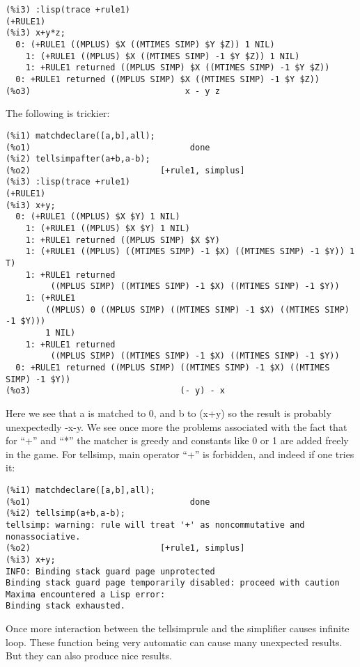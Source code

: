\documentclass[a4paper,11pt]{article}
\begin{document}
\begin{verbatim}
(%i3) :lisp(trace +rule1)
(+RULE1)
(%i3) x+y*z;
  0: (+RULE1 ((MPLUS) $X ((MTIMES SIMP) $Y $Z)) 1 NIL)
    1: (+RULE1 ((MPLUS) $X ((MTIMES SIMP) -1 $Y $Z)) 1 NIL)
    1: +RULE1 returned ((MPLUS SIMP) $X ((MTIMES SIMP) -1 $Y $Z))
  0: +RULE1 returned ((MPLUS SIMP) $X ((MTIMES SIMP) -1 $Y $Z))
(%o3)                               x - y z
\end{verbatim}
The following is trickier:
\begin{verbatim}
(%i1) matchdeclare([a,b],all);
(%o1)                                done
(%i2) tellsimpafter(a+b,a-b);
(%o2)                          [+rule1, simplus]
(%i3) :lisp(trace +rule1)
(+RULE1)
(%i3) x+y;
  0: (+RULE1 ((MPLUS) $X $Y) 1 NIL)
    1: (+RULE1 ((MPLUS) $X $Y) 1 NIL)
    1: +RULE1 returned ((MPLUS SIMP) $X $Y)
    1: (+RULE1 ((MPLUS) ((MTIMES SIMP) -1 $X) ((MTIMES SIMP) -1 $Y)) 1 T)
    1: +RULE1 returned
         ((MPLUS SIMP) ((MTIMES SIMP) -1 $X) ((MTIMES SIMP) -1 $Y))
    1: (+RULE1
        ((MPLUS) 0 ((MPLUS SIMP) ((MTIMES SIMP) -1 $X) ((MTIMES SIMP) -1 $Y)))
        1 NIL)
    1: +RULE1 returned
         ((MPLUS SIMP) ((MTIMES SIMP) -1 $X) ((MTIMES SIMP) -1 $Y))
  0: +RULE1 returned ((MPLUS SIMP) ((MTIMES SIMP) -1 $X) ((MTIMES SIMP) -1 $Y))
(%o3)                              (- y) - x
\end{verbatim}
Here we see that a is matched to 0, and b to (x+y) so the result is
probably unexpectedly -x-y.  We see once more the problems associated
with the fact that for ``+'' and ``*'' the matcher is greedy and constants
like 0 or 1 are added freely in the game. For tellsimp, main operator ``+''
is forbidden, and indeed if one tries it:
\begin{verbatim}
(%i1) matchdeclare([a,b],all);
(%o1)                                done
(%i2) tellsimp(a+b,a-b);
tellsimp: warning: rule will treat '+' as noncommutative and nonassociative.
(%o2)                          [+rule1, simplus]
(%i3) x+y;
INFO: Binding stack guard page unprotected
Binding stack guard page temporarily disabled: proceed with caution
Maxima encountered a Lisp error:
Binding stack exhausted.
\end{verbatim}

Once more interaction between the tellsimprule and the simplifier
causes infinite loop. These function being very automatic can cause
many unexpected results. But they can also produce nice results.
\end{document}
